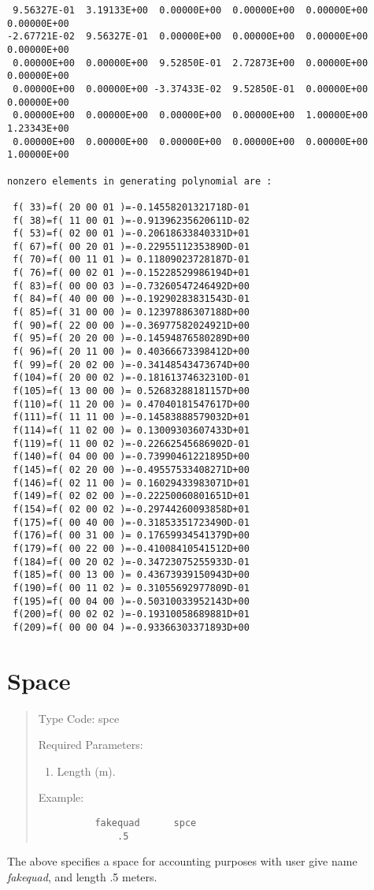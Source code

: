 \begin{footnotesize}
\begin{verbatim}
 9.56327E-01  3.19133E+00  0.00000E+00  0.00000E+00  0.00000E+00  0.00000E+00
-2.67721E-02  9.56327E-01  0.00000E+00  0.00000E+00  0.00000E+00  0.00000E+00
 0.00000E+00  0.00000E+00  9.52850E-01  2.72873E+00  0.00000E+00  0.00000E+00
 0.00000E+00  0.00000E+00 -3.37433E-02  9.52850E-01  0.00000E+00  0.00000E+00
 0.00000E+00  0.00000E+00  0.00000E+00  0.00000E+00  1.00000E+00  1.23343E+00
 0.00000E+00  0.00000E+00  0.00000E+00  0.00000E+00  0.00000E+00  1.00000E+00

nonzero elements in generating polynomial are :

 f( 33)=f( 20 00 01 )=-0.14558201321718D-01
 f( 38)=f( 11 00 01 )=-0.91396235620611D-02
 f( 53)=f( 02 00 01 )=-0.20618633840331D+01
 f( 67)=f( 00 20 01 )=-0.22955112353890D-01
 f( 70)=f( 00 11 01 )= 0.11809023728187D-01
 f( 76)=f( 00 02 01 )=-0.15228529986194D+01
 f( 83)=f( 00 00 03 )=-0.73260547246492D+00
 f( 84)=f( 40 00 00 )=-0.19290283831543D-01
 f( 85)=f( 31 00 00 )= 0.12397886307188D+00
 f( 90)=f( 22 00 00 )=-0.36977582024921D+00
 f( 95)=f( 20 20 00 )=-0.14594876580289D+00
 f( 96)=f( 20 11 00 )= 0.40366673398412D+00
 f( 99)=f( 20 02 00 )=-0.34148543473674D+00
 f(104)=f( 20 00 02 )=-0.18161374632310D-01
 f(105)=f( 13 00 00 )= 0.52683288181157D+00
 f(110)=f( 11 20 00 )= 0.47040181547617D+00
 f(111)=f( 11 11 00 )=-0.14583888579032D+01
 f(114)=f( 11 02 00 )= 0.13009303607433D+01
 f(119)=f( 11 00 02 )=-0.22662545686902D-01
 f(140)=f( 04 00 00 )=-0.73990461221895D+00
 f(145)=f( 02 20 00 )=-0.49557533408271D+00
 f(146)=f( 02 11 00 )= 0.16029433983071D+01
 f(149)=f( 02 02 00 )=-0.22250060801651D+01
 f(154)=f( 02 00 02 )=-0.29744260093858D+01
 f(175)=f( 00 40 00 )=-0.31853351723490D-01
 f(176)=f( 00 31 00 )= 0.17659934541379D+00
 f(179)=f( 00 22 00 )=-0.41008410541512D+00
 f(184)=f( 00 20 02 )=-0.34723075255933D-01
 f(185)=f( 00 13 00 )= 0.43673939150943D+00
 f(190)=f( 00 11 02 )= 0.31055692977809D-01
 f(195)=f( 00 04 00 )=-0.50310033952143D+00
 f(200)=f( 00 02 02 )=-0.19310058689881D+01
 f(209)=f( 00 00 04 )=-0.93366303371893D+00
\end{verbatim}
\end{footnotesize}
\newpage

\section{Space}
\begin{quotation}
\noindent Type Code:  spce
\vspace{5mm}

\noindent Required Parameters:
\begin{enumerate}
    \item  Length (m).
\end{enumerate}

\vspace{5mm}
\noindent Example:
\begin{verbatim}
          fakequad      spce
              .5
\end{verbatim}
\end{quotation}
The above specifies a space for accounting purposes with user give name {\em fakequad}, and length .5 meters.

